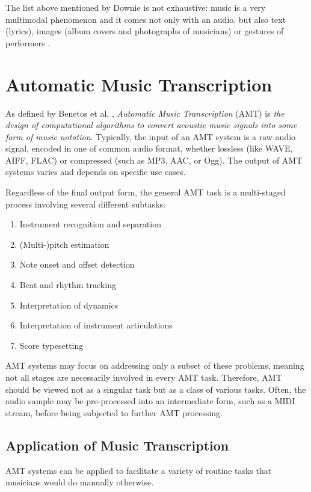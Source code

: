The list above mentioned by Downie is not exhaustive: music is a very multimodal phenomenon and it comes not only with an audio, but also text (lyrics), images (album covers and photographs of musicians) or gestures of performers \cite{Schedl2014}.

\section{Automatic Music Transcription}

As defined by Benetos et al. \cite{Benetos2019}, \emph{Automatic Music Transcription} (AMT) is \emph{the design of computational algorithms to convert acoustic music signals into some form of music notation}. Typically, the input of an AMT system is a raw audio signal, encoded in one of common audio format, whether lossless (like WAVE, AIFF, FLAC) or compressed (such as MP3, AAC, or Ogg). The output of AMT systems varies and depends on specific use cases.

Regardless of the final output form, the general AMT task is a multi-staged process involving several different subtasks:
\begin{enumerate}
	\item Instrument recognition and separation
	\item (Multi-)pitch estimation
	\item Note onset and offset detection
	\item Beat and rhythm tracking
	\item Interpretation of dynamics
	\item Interpretation of instrument articulations
	\item Score typesetting
\end{enumerate}

AMT systems may focus on addressing only a subset of these problems, meaning not all stages are necessarily involved in every AMT task. Therefore, AMT should be viewed not as a singular task but as a class of various tasks. Often, the audio sample may be pre-processed into an intermediate form, such as a MIDI stream, before being subjected to further AMT processing.

\subsection{Application of Music Transcription}

AMT systems can be applied to facilitate a variety of routine tasks that musicians would do manually otherwise.


